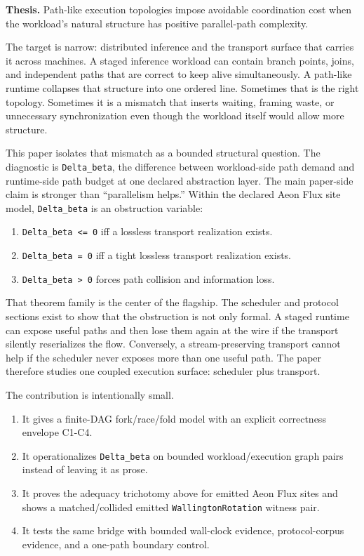 \documentclass[
  11pt,
]{article}
\providecommand{\tightlist}{%
  \setlength{\itemsep}{0pt}\setlength{\parskip}{0pt}}
\begin{document}
\textbf{Thesis.} Path-like execution topologies impose avoidable
coordination cost when the workload's natural structure has positive
parallel-path complexity.

The target is narrow: distributed inference and the transport surface
that carries it across machines. A staged inference workload can contain
branch points, joins, and independent paths that are correct to keep
alive simultaneously. A path-like runtime collapses that structure into
one ordered line. Sometimes that is the right topology. Sometimes it is
a mismatch that inserts waiting, framing waste, or unnecessary
synchronization even though the workload itself would allow more
structure.

This paper isolates that mismatch as a bounded structural question. The
diagnostic is \texttt{Delta\_beta}, the difference between workload-side
path demand and runtime-side path budget at one declared abstraction
layer. The main paper-side claim is stronger than ``parallelism helps.''
Within the declared Aeon Flux site model, \texttt{Delta\_beta} is an
obstruction variable:

\begin{enumerate}
\def\labelenumi{\arabic{enumi}.}
\tightlist
\item
  \texttt{Delta\_beta\ \textless{}=\ 0} iff a lossless transport
  realization exists.
\item
  \texttt{Delta\_beta\ =\ 0} iff a tight lossless transport realization
  exists.
\item
  \texttt{Delta\_beta\ \textgreater{}\ 0} forces path collision and
  information loss.
\end{enumerate}

That theorem family is the center of the flagship. The scheduler and
protocol sections exist to show that the obstruction is not only formal.
A staged runtime can expose useful paths and then lose them again at the
wire if the transport silently reserializes the flow. Conversely, a
stream-preserving transport cannot help if the scheduler never exposes
more than one useful path. The paper therefore studies one coupled
execution surface: scheduler plus transport.

The contribution is intentionally small.

\begin{enumerate}
\def\labelenumi{\arabic{enumi}.}
\tightlist
\item
  It gives a finite-DAG fork/race/fold model with an explicit
  correctness envelope C1-C4.
\item
  It operationalizes \texttt{Delta\_beta} on bounded workload/execution
  graph pairs instead of leaving it as prose.
\item
  It proves the adequacy trichotomy above for emitted Aeon Flux sites
  and shows a matched/collided emitted \texttt{WallingtonRotation}
  witness pair.
\item
  It tests the same bridge with bounded wall-clock evidence,
  protocol-corpus evidence, and a one-path boundary control.
\end{enumerate}
\end{document}
